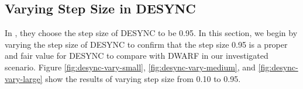 \subsection{Varying Step Size in DESYNC}
\label{sec:varystepsize}
In \cite{4379660}, they choose the step size of DESYNC to be 0.95. In this section, we begin by varying the step size of DESYNC to confirm that the step size 0.95 is a proper and fair value for DESYNC to compare with DWARF in our investigated scenario.
Figure \ref{fig:desync-vary-small}, \ref{fig:desync-vary-medium}, and \ref{fig:desync-vary-large} show the results of varying step size from 0.10 to 0.95.
\begin{figure}%
\centering
    \hspace{8pt}%
\end{figure}
